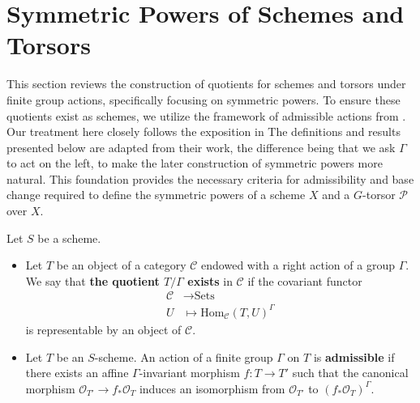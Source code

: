 \section{Symmetric Powers of Schemes and Torsors}
This section reviews the construction of quotients for schemes and torsors under finite group actions, specifically focusing on symmetric powers. 
To ensure these quotients exist as schemes, we utilize the framework of admissible actions from \cite{sga1}. 
Our treatment here closely follows the exposition in \cite{Guignard2018}
The definitions and results presented below are adapted from their work, the difference being that we ask $\Gamma$ to act on the left, to make the later construction of symmetric powers more natural. 
This foundation provides the necessary criteria for admissibility and base change required to define the symmetric powers of a scheme $X$
 and a $G$-torsor $\mathcal{P}$ over $X$.


Let $S$ be a scheme.

\begin{definition}
    \noindent
    \begin{itemize}
        \item Let $T$ be an object of a category $\mathcal{C}$ endowed with a right action of a group $\Gamma$. We say that \textbf{the quotient $T/\Gamma$ exists} in $\mathcal{C}$ if the covariant functor
    \[
    \begin{aligned}
    \mathcal{C} &\to \text{Sets} \\
    U &\mapsto \text{Hom}_{\mathcal{C}}(T, U)^{\Gamma}
    \end{aligned}
    \]
    is representable by an object of $\mathcal{C}$.
    \item Let $T$ be an $S$-scheme. An action of a finite group $\Gamma$ on $T$ is \textbf{admissible} if there exists an affine $\Gamma$-invariant morphism $f : T \to T'$ such that the canonical morphism $\mathcal{O}_{T'} \to f_* \mathcal{O}_T$ induces an isomorphism from $\mathcal{O}_{T'}$ to $(f_* \mathcal{O}_T)^{\Gamma}$.
\end{itemize}
\end{definition}

